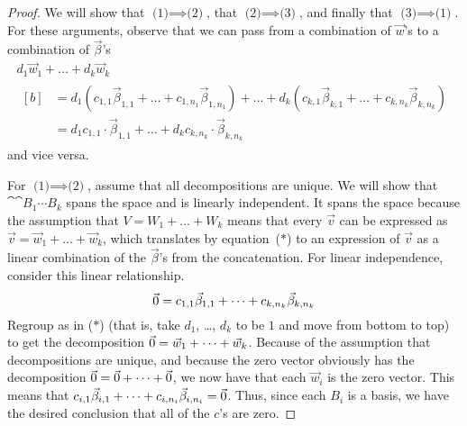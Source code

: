 \begin{proof}
We will show that $\text{(1)}\implies\text{(2)}$, 
that $\text{(2)}\implies\text{(3)}$, 
and finally that $\text{(3)}\implies\text{(1)}$.
For these arguments, observe that we can pass from a combination of 
$\vec{w}$'s to a combination of $\vec{\beta}$'s
\renewcommand{\theequation}{$*$}
\begin{multline}
  d_1\vec{w}_1+\dots+d_k\vec{w}_k                            \\
  \begin{aligned}[b]
    \mbox{}
    &= d_1(c_{1,1}\vec{\beta}_{1,1}+\dots+c_{1,n_1}\vec{\beta}_{1,n_1})
        +\dots
        +d_k(c_{k,1}\vec{\beta}_{k,1}+\dots+c_{k,n_k}\vec{\beta}_{k,n_k}) \\
    &= d_1c_{1,1}\cdot\vec{\beta}_{1,1}
        +\dots
        +d_kc_{k,n_k}\cdot\vec{\beta}_{k,n_k} 
  \end{aligned}
\end{multline}
and vice versa.

For $\text{(1)}\implies\text{(2)}$,
assume that all decompositions are unique.
We will show that $\cat{\cat{B_1}{\cdots}}{B_k}$ spans the
space and is linearly independent.
It spans the space because the assumption 
that $V=W_1+\dots+W_k$
means that every $\vec{v}$ can be expressed as 
$\vec{v}=\vec{w}_1+\dots+\vec{w}_k$, which translates by equation~($*$) to 
an expression of $\vec{v}$ as a linear combination of the $\vec{\beta}$'s
from the concatenation.
For linear independence, consider this linear relationship.
\begin{equation*}
  \vec{0}=c_{1,1}\vec{\beta}_{1,1}+\dots+c_{k,n_k}\vec{\beta}_{k,n_k}
\end{equation*}
Regroup as in ($*$) (that is, take $d_1$, \ldots, $d_k$ to be $1$ and
move from bottom to top) to get
the decomposition $\vec{0}=\vec{w}_1+\dots+\vec{w}_k$.
Because of the assumption that decompositions are unique, 
and because the zero vector obviously
has the decomposition $\vec{0}=\vec{0}+\dots+\vec{0}$,
we now have that each $\vec{w}_i$ is the zero vector.
This means that
$c_{i,1}\vec{\beta}_{i,1}+\dots+c_{i,n_i}\vec{\beta}_{i,n_i}=\vec{0}$.
Thus, since each $B_i$ is a basis, we have the desired conclusion that all of
the $c$'s are zero.


\end{proof}
